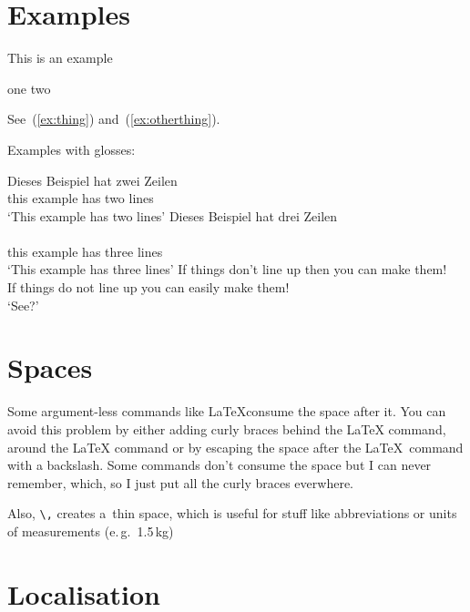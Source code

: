 \documentclass{scrartcl}
\begin{document}
\section{Examples}

\begin{exe}
  \ex This is an example
  \begin{xlist}
    \ex\label{ex:otherthing} one
    \ex two
  \end{xlist}
\end{exe}

See~(\ref{ex:thing}) and~(\ref{ex:otherthing}).

Examples with glosses:

\begin{exe}
  \ex \gll Dieses Beispiel hat zwei Zeilen \\
    this example has two lines \\
    \trans `This example has two lines'
  \ex \glll Dieses Beispiel hat drei Zeilen \\
         \\
    this example has three lines \\
    \trans `This example has three lines'
  \ex \gll If things don't line up then you can {} make them! \\
    If things {do not} line up {} you can easily make them! \\
    \trans `See?'
\end{exe}

\section{Spaces}

Some argument-less commands like \LaTeX consume the space after it.
You can avoid this problem by either adding curly braces behind the \LaTeX{}
command, around the {\LaTeX} command or by escaping the space after the
\LaTeX\ command with a backslash.
Some commands don't consume the space but I can never remember, which, so I just
put all the curly braces everwhere.

Also, \texttt{\textbackslash,} creates a~thin space, which is useful for stuff
like abbreviations or units of measurements (e.\,g.\ 1.5\,kg)

\section{Localisation}
\end{document}
